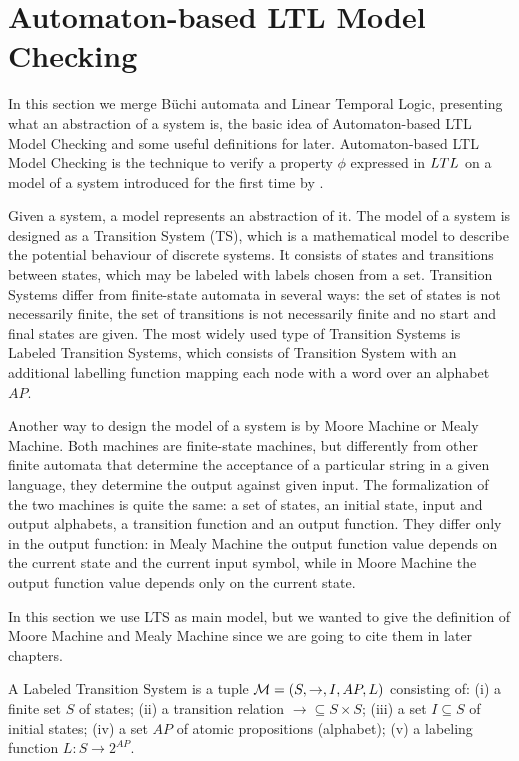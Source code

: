 
\section{Automaton-based LTL Model Checking}
\label{sec:ltl-model-checking}

In this section we merge B{\"u}chi automata and Linear Temporal Logic, presenting what an abstraction of a system is, the basic idea of Automaton-based LTL Model Checking and some useful definitions for later.
Automaton-based LTL Model Checking is the technique to verify a property $\phi$ expressed in $LTL$ on a model of a system introduced for the first time by \cite{VW86}. 

Given a system, a model represents an abstraction of it. 
The model of a system is designed as a Transition System (TS), which is a mathematical model to describe the potential behaviour of discrete systems. It consists of states and transitions between states, which may be labeled with labels chosen from a set.
Transition Systems differ from finite-state automata in several ways: the set of states is not necessarily finite, the set of transitions is not necessarily finite and no start and final states are given. 
The most widely used type of Transition Systems is Labeled Transition Systems, which consists of Transition System with an additional labelling function mapping each node with a word over an alphabet $AP$.

Another way to design the model of a system is by Moore Machine or Mealy Machine. Both machines are finite-state machines, but differently from other finite automata that determine the acceptance of a particular string in a given language, they determine the output against given input. The formalization of the two machines is quite the same: a set of states, an initial state, input and output alphabets, a transition function and an output function. They differ only in the output function: in Mealy Machine the output function value depends on the current state and the current input symbol, while in Moore Machine the output function value depends only on the current state.

In this section we use LTS as main model, but we wanted to give the definition of Moore Machine and Mealy Machine since we are going to cite them in later chapters.

\begin{definition}
A Labeled Transition System is a tuple $\mathcal{M} = \left( S, \to, I, AP, L \right)$ consisting of: (i) a finite set $S$ of states; (ii) a transition relation $\to \subseteq S \times S$; (iii) a set $I \subseteq S$ of initial states; (iv) a set $AP$ of atomic propositions (alphabet); (v) a labeling function $L \colon S \to 2^{AP}$.
\end{definition}

